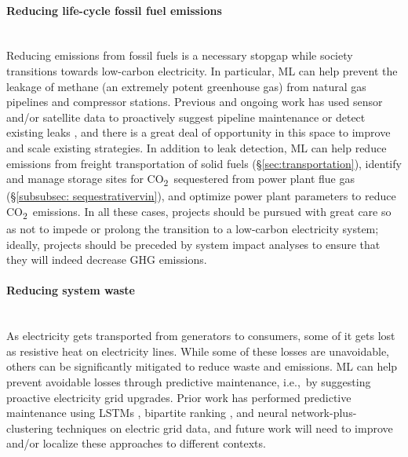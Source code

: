 \documentclass[11pt]{report}
\newcommand{\carbon}{\texorpdfstring{CO\textsubscript{2}}{CO2}}
\newcommand{\Gap}{\texorpdfstring{\hfill}{}}
\newcommand{\Rec}{\texorpdfstring{{\small\emph{\color{blue}{\fbox{High Leverage}}}}}{}}
\newcommand{\HighRisk}{\texorpdfstring{{\small\emph{\color{orange}{\fbox{Uncertain Impact}}}}}{}}
\begin{document}
\paragraph{Reducing life-cycle fossil fuel emissions}\Gap\textbf{\Rec\HighRisk}\mbox{}\\\label{sec:electricity-methane}Reducing emissions from fossil fuels is a necessary stopgap while society transitions towards low-carbon electricity. In particular, ML can help prevent the leakage of methane (an extremely potent greenhouse gas) from natural gas pipelines and compressor stations. Previous and ongoing work has used sensor and/or satellite data to proactively suggest pipeline maintenance \cite{zukhrufany2018utilization, edward2018oil} or detect existing leaks \cite{wan2012hierarchical, swri2016swri, bluefieldtechnologies}, and there is a great deal of opportunity in this space to improve and scale existing strategies. In addition to leak detection, ML can help reduce emissions from freight transportation of solid fuels (\S\ref{sec:transportation}), identify and manage storage sites for \carbon~sequestered from power plant flue gas (\S\ref{subsubsec: sequestrativervin}), and optimize power plant parameters to reduce \carbon~emissions.
In all these cases, projects should be pursued with great care so as not to impede or prolong the transition to a low-carbon electricity system; ideally, projects should be preceded by system impact analyses to ensure that they will indeed decrease GHG emissions.

\paragraph{Reducing system waste}
\mbox{}\\ As electricity gets transported from generators to consumers, some of it gets lost as resistive heat on electricity lines. While some of these losses are unavoidable, others can be significantly mitigated to reduce waste and emissions. ML can help prevent avoidable losses through predictive maintenance, i.e.,~by suggesting proactive electricity grid upgrades. Prior work has performed predictive maintenance using LSTMs \cite{bhattacharya2017deep}, bipartite ranking \cite{rudin2012machine}, and neural network-plus-clustering techniques \cite{nguyen2018automatic} on electric grid data, and future work will need to improve and/or localize these approaches to different contexts.
\end{document}
